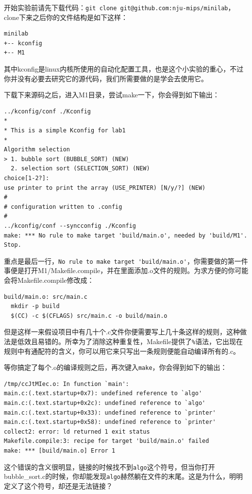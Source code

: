 \documentclass[lang=cn,11pt,a4paper]{elegantpaper}
\begin{document}
开始实验前请先下载代码：\lstinline!git clone git@github.com:nju-mips/minilab!，clone下来之后你的文件结构是如下这样：
\begin{lstlisting}
minilab
+-- kconfig
+-- M1
\end{lstlisting}

其中kconfig是linux内核所使用的自动化配置工具，也是这个小实验的重心，不过你并没有必要去研究它的源代码，我们所需要做的是学会去使用它。

下载下来源码之后，进入M1目录，尝试make一下，你会得到如下输出：
\begin{lstlisting}
../kconfig/conf ./Kconfig
*
* This is a simple Kconfig for lab1
*
Algorithm selection
> 1. bubble sort (BUBBLE_SORT) (NEW)
  2. selection sort (SELECTION_SORT) (NEW)
choice[1-2?]:
use printer to print the array (USE_PRINTER) [N/y/?] (NEW)
#
# configuration written to .config
#
../kconfig/conf --syncconfig ./Kconfig
make: *** No rule to make target 'build/main.o', needed by 'build/M1'.  Stop.
\end{lstlisting}

重点是最后一行，\lstinline!No rule to make target 'build/main.o'!，你需要做的第一件事便是打开M1/Makefile.compile，并在里面添加.o文件的规则。为求方便的你可能会将Makefile.compile修改成：
\begin{lstlisting}
build/main.o: src/main.c
  mkdir -p build
  $(CC) -c $(CFLAGS) src/main.c -o build/main.o
\end{lstlisting}
但是这样一来假设项目中有几十个.c文件你便需要写上几十条这样的规则，这种做法是低效且易错的。所幸为了消除这种重复性，Makefile提供了\lstinline!%!语法，它出现在规则中有通配符的含义，你可以用它来只写出一条规则便能自动编译所有的.c。

等你搞定了每个.o的编译规则之后，再次键入\lstinline!make!，你会得到如下的输出：
\begin{lstlisting}
/tmp/ccJtMIec.o: In function `main':
main.c:(.text.startup+0x7): undefined reference to `algo'
main.c:(.text.startup+0x2c): undefined reference to `algo'
main.c:(.text.startup+0x33): undefined reference to `printer'
main.c:(.text.startup+0x58): undefined reference to `printer'
collect2: error: ld returned 1 exit status
Makefile.compile:3: recipe for target 'build/main.o' failed
make: *** [build/main.o] Error 1
\end{lstlisting}

这个错误的含义很明显，链接的时候找不到\lstinline!algo!这个符号，但当你打开bubble\_sort.c的时候，你却能发现\lstinline!algo!赫然躺在文件的末尾。这是为什么，明明定义了这个符号，却还是无法链接？
\end{document}

